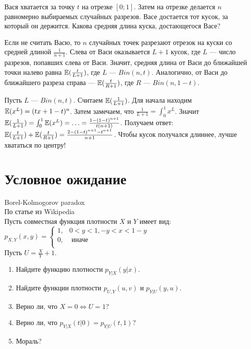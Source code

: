 \begin{problem}
Вася хватается за точку $t$ на отрезке $[0;1]$. Затем на отрезке делается $n$ равномерно выбираемых случайных разрезов.
Васе достается тот кусок, за который он держится. Какова средняя длина куска, достающегося Васе?

\begin{sol}

Если не считать Васю, то $n$ случайных точек разрезают отрезок на куски со средней длиной $\frac{1}{n+1}$.
Слева от Васи оказывается $L+1$ кусок, где $L$ — число разрезов, попавших слева от Васи. Значит, средняя длина от Васи до ближайшей точки налево равна
$\mathbb{E}(\frac{t}{L+1})$, где $L$ — $Bin(n,t)$. Аналогично, от Васи до ближайшего разреза справа — $\mathbb{E}(\frac{t}{R+1})$, где $R$ — $Bin(n,1-t)$.

Пусть $L$ — $Bin(n,t)$. Считаем $\mathbb{E}(\frac{1}{L+1})$. Для начала находим $\mathbb{E}(x^{L})=(tx+1-t)^{n}$.
Затем замечаем, что $\frac{1}{L+1}=\int_{0}^{1}x^{L}$. Значит $\mathbb{E}(\frac{1}{L+1})=\int_{0}^{1}\mathbb{E}(x^{L})=\ldots=\frac{1-(1-t)^{n+1}}{t(n+1)}$.
Получаем ответ: $\mathbb{E}(\frac{t}{L+1})+\mathbb{E}(\frac{t}{R+1})=\frac{2-(1-t)^{n+1}-t^{n+1}}{n+1}$.
Чтобы кусок получался длиннее, лучше хвататься по центру!
\end{sol}
\end{problem}




\section{Условное ожидание}

\begin{problem}
 Borel-Kolmogorov paradox \\
По статье из Wikipedia \\
Пусть совместная функция плотности $X$ и $Y$ имеет вид: \\
$p_{X,Y}(x,y)=
\begin{cases}
  1, & 0<y<1, -y<x<1-y \\
  0, & \text{ иначе } \\
\end{cases}$ \\
Пусть $U=\frac{X}{Y}+1$.

\begin{enumerate}
\item Найдите функцию плотности $p_{Y|X}(y|x)$.
\item Найдите функции плотности  $p_{U,Y}(u,v)$ и $p_{Y|U}(y,u)$.
\item Верно ли, что $X=0 \Leftrightarrow U=1$?
\item Верно ли, что $p_{Y|X}(t|0)=p_{Y|U}(t,1)$?
\item Мораль?
\end{enumerate}

\begin{sol}

\end{sol}
\end{problem}

